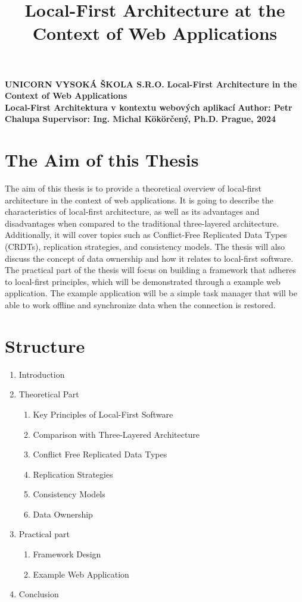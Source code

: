 \documentclass{article}
\title{Local-First Architecture at the Context of Web Applications}
\begin{document}
	\begin{titlepage}
		\begin{center}
			\textbf{UNICORN VYSOKÁ ŠKOLA S.R.O.}
			\vfill
			\textbf{\LARGE Local-First Architecture in the Context of Web Applications\\}
			\vspace{5mm}
			\textbf{Local-First Architektura v kontextu webových aplikací}
			\vfill
			\textbf{Author: Petr Chalupa}
			\vfill
			\textbf{Supervisor: Ing. Michal Kökörčený, Ph.D.}
			\vfill
			\textbf{Prague, 2024}
			\vfill
		\end{center}
	\end{titlepage}
	\newpage
	\section{The Aim of this Thesis}
	The aim of this thesis is to provide a theoretical overview of local-first architecture in the context of web applications. It is going to describe the characteristics of local-first architecture, as well as its advantages and disadvantages when compared to the traditional three-layered architecture. Additionally, it will cover topics such as Conflict-Free Replicated Data Types (CRDTs), replication strategies, and consistency models. The thesis will also discuss the concept of data ownership and how it relates to local-first software.
	The practical part of the thesis will focus on building a framework that adheres to local-first principles, which will be demonstrated through a example web application. The example application will be a simple task manager that will be able to work offline and synchronize data when the connection is restored.
	\section{Structure}
	\begin{enumerate}
		\item Introduction
		\item Theoretical Part
		\begin{enumerate}[label=\arabic{enumi}.\arabic*]
			\item Key Principles of Local-First Software
			\item Comparison with Three-Layered Architecture
			\item Conflict Free Replicated Data Types
			\item Replication Strategies
			\item Consistency Models
			\item Data Ownership
		\end{enumerate}
		\item Practical part
		\begin{enumerate}[label=\arabic{enumi}.\arabic*]
			\item Framework Design
			\item Example Web Application
		\end{enumerate}
		\item Conclusion
	\end{enumerate}
	\nocite{*}
	\printbibliography[title={Literature},heading=bibnumbered]
\end{document}
